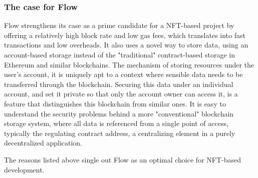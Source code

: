 \subsubsection{The case for Flow}
Flow strengthens its case as a prime candidate for a NFT-based project by offering a relatively high block rate and low gas fees, which translates into fast transactions and low overheads. It also uses a novel way to store data, using an account-based storage instead of the "traditional" contract-based storage in Ethereum and similar blockchains. The mechanism of storing resources under the user's account, it is uniquely apt to a context where sensible data needs to be transferred through the blockchain. Securing this data under an individual account, and set it private so that only the account owner can access it, is a feature that distinguishes this blockchain from similar ones. It is easy to understand the security problems behind a more "conventional" blockchain storage system, where all data is referenced from a single point of access, typically the regulating contract address, a centralizing element in a purely decentralized application.
\par
The reasons listed above single out Flow as an optimal choice for NFT-based development.